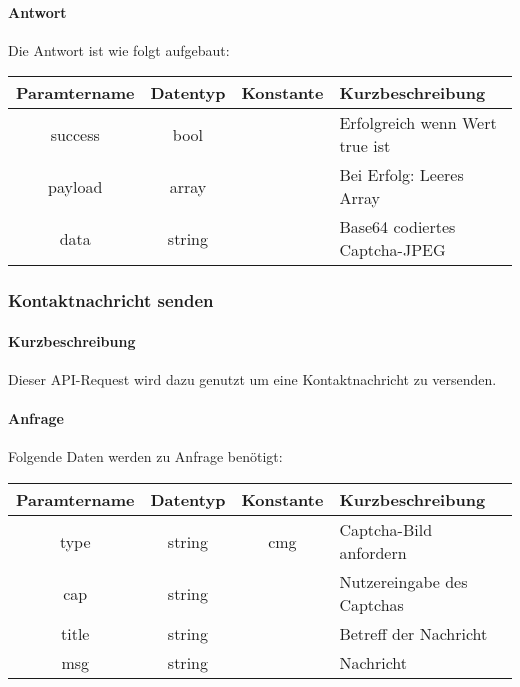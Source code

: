\paragraph{Antwort}Die Antwort ist wie folgt aufgebaut:
\begin{table}[H]
	\begin{tabular}{|c|c|c|p{6.5cm}|}
		\hline
		\textbf{Paramtername} & \textbf{Datentyp} & \textbf{Konstante} & \textbf{Kurzbeschreibung}            \\ \hline                
		success             & bool             &                 & Erfolgreich wenn Wert {\glqq true\grqq} ist \\ \hline
		payload             & array            &                 & Bei Erfolg: Leeres Array \\ \hline
		data                & string           &                 & Base64 codiertes Captcha-JPEG \\ \hline
	\end{tabular}
\end{table}
\subsubsection{Kontaktnachricht senden}
\paragraph{Kurzbeschreibung}Dieser API-Request wird dazu genutzt um eine Kontaktnachricht zu versenden.
\paragraph{Anfrage}Folgende Daten werden zu Anfrage benötigt:
\begin{table}[H]
	\begin{tabular}{|c|c|c|p{6.5cm}|}
		\hline
		\textbf{Paramtername} & \textbf{Datentyp} & \textbf{Konstante} & \textbf{Kurzbeschreibung}                                                                                               \\ \hline
		type                & string            & cmg                & Captcha-Bild anfordern \\ \hline
		cap                 & string            &                    & Nutzereingabe des Captchas \\ \hline
		title               & string            &                    & Betreff der Nachricht \\ \hline
		msg                 & string            &                    & Nachricht \\ \hline
	\end{tabular}
\end{table}
